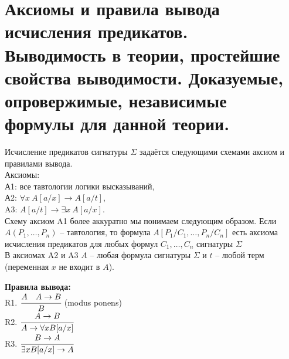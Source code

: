 \section[Аксиомы и правила вывода исчисления предикатов. Выводимость в теории, простейшие свойства. Доказуемые,
опровержимые и независимые формулы для теории]{Аксиомы и правила вывода исчисления предикатов.\\Выводимость в
теории, простейшие свойства выводимости. Доказуемые, опровержимые, независимые формулы для данной теории.}
Исчисление предикатов сигнатуры $\Sigma$ задаётся следующими схемами аксиом и правилами вывода.\\
Аксиомы:\\
А1: все тавтологии логики высказываний,\\
А2: $\forall x \ A[a/x] \rightarrow A[a/t]$,\\
A3: $A[a/t] \rightarrow \exists x \ A[a/x]$. \\
Схему аксиом A1 более аккуратно мы понимаем следующим образом. Если $A(P_1,\ldots,P_n)$ -- тавтология, то формула
$A[P_1/C_1,\ldots,P_n/C_n]$ есть аксиома исчисления предикатов для любых формул $C_1,\ldots,C_n$ сигнатуры
$\Sigma$\\
В аксиомах A2 и A3 $A$ -- любая формула сигнатуры $\Sigma$ и $t$ -- любой терм (переменная $x$ не входит в $A$).

\textbf{Правила вывода:}\\
R1. $\cfrac{A \quad A \rightarrow B}{B}$ (modus ponens)\\ \medskip 
R2. $\cfrac{A \rightarrow B}{A \rightarrow \forall x B[a / x]}$\\ \medskip 
R3. $\cfrac{B \rightarrow A}{\exists x B[a / x] \rightarrow A}$


